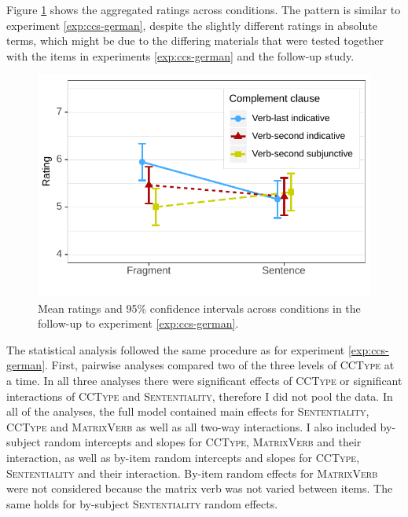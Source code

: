 Figure \ref{fig:ccs-german-short-estimates} shows the aggregated ratings across conditions. The pattern is similar to experiment \ref{exp:ccs-german}, despite the slightly different ratings in absolute terms, which might be due to the differing materials that were tested together with the items in experiments \ref{exp:ccs-german} and the follow-up study.
%
\begin{figure}[t]
\includegraphics[scale=1]{figures/ex2b_ccs_de_sc_estimates}
 \caption{Mean ratings and 95\% confidence intervals across conditions in the follow-up to experiment \ref{exp:ccs-german}. \label{fig:ccs-german-short-estimates}}
\end{figure}
%
The statistical analysis followed the same procedure as for experiment \ref{exp:ccs-german}. First, pairwise analyses compared two of the three levels of \textsc{CCType} at a time. In all three analyses there were significant effects of \textsc{CCType} or significant interactions of \textsc{CCType} and \textsc{Sententiality}, therefore I did not pool the data. In all of the analyses, the full model contained main effects for \textsc{Sententiality}, \textsc{CCType} and \textsc{MatrixVerb} as well as all two-way interactions. I also included by-subject random intercepts and slopes for \textsc{CCType}, \textsc{MatrixVerb} and their interaction, as well as by-item random intercepts and slopes for \textsc{CCType}, \textsc{Sententiality} and their interaction. By-item random effects for \textsc{MatrixVerb} were not considered because the matrix verb was not varied between items. The same holds for by-subject \textsc{Sententiality} random effects.\largerpage

